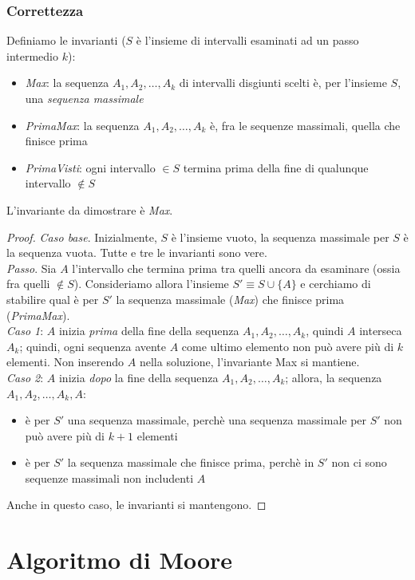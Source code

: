 \documentclass[11pt]{book}
\begin{document}
\subsubsection{Correttezza}
Definiamo le invarianti ($S$ è l'insieme di intervalli esaminati ad un passo intermedio $k$): 
\begin{itemize}
    \item \textit{Max}: la sequenza $A_1,A_2,\dots,A_k$ di intervalli disgiunti scelti è, per l'insieme $S$, una \textit{sequenza massimale}
    \item \textit{PrimaMax}: la sequenza $A_1,A_2,\dots,A_k$ è, fra le sequenze massimali, quella che finisce prima 
    \item \textit{PrimaVisti}: ogni intervallo $\in S$ termina prima della fine di qualunque intervallo $\notin S$
\end{itemize}
L'invariante da dimostrare è \textit{Max}.
\begin{proof}
    \textit{Caso base}. Inizialmente, $S$ è l'insieme vuoto, la sequenza massimale per $S$ è la sequenza vuota. Tutte e 
    tre le invarianti sono vere.\\
    \textit{Passo}. Sia $A$ l'intervallo che termina prima tra quelli ancora da esaminare (ossia fra quelli $\notin S$).
    Consideriamo allora l'insieme $S'\equiv S \cup \{A\}$ e cerchiamo di stabilire qual è per $S'$ la sequenza massimale 
    (\textit{Max}) che finisce prima (\textit{PrimaMax}).\\
    \textit{Caso 1}: $A$ inizia \textit{prima} della fine della sequenza $A_1,A_2,\dots,A_k$, quindi $A$ interseca $A_k$; quindi, 
    ogni sequenza avente $A$ come ultimo elemento non può avere più di $k$ elementi. Non inserendo $A$ nella soluzione, 
    l'invariante Max si mantiene.\\
    \textit{Caso 2}: $A$ inizia \textit{dopo} la fine della sequenza $A_1,A_2,\dots,A_k$; allora, la sequenza $A_1,A_2,\dots,A_k,A$: 
    \begin{itemize}
        \item è per $S'$ una sequenza massimale, perchè una sequenza massimale per $S'$ non può avere più di $k+1$ elementi 
        \item è per $S'$ la sequenza massimale che finisce prima, perchè in $S'$ non ci sono sequenze massimali non includenti 
        $A$
    \end{itemize}
    Anche in questo caso, le invarianti si mantengono. 
\end{proof}
\section{Algoritmo di Moore}
\end{document}
